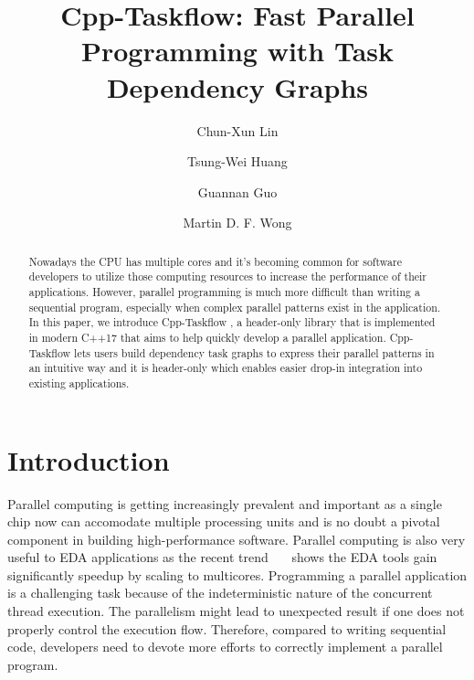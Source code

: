 \documentclass[sigconf]{acmart}
\begin{document}

\fancyhead{}
\title{Cpp-Taskflow: Fast Parallel Programming with Task Dependency Graphs}



\author{Chun-Xun Lin}
%
\author{Tsung-Wei Huang}
%
\author{Guannan Guo}
%
\author{Martin D. F. Wong}





\begin{abstract}
Nowadays the CPU has multiple cores and it's becoming common for software 
developers to utilize those computing resources to increase the performance of their applications.
However, parallel programming is much more difficult than writing a sequential program, 
especially when complex parallel patterns exist in the application. 
In this paper, we introduce Cpp-Taskflow \cite{cpp-taskflow}, a header-only library that is implemented in
modern C++17 that aims to help quickly develop a parallel application. Cpp-Taskflow lets 
users build dependency task graphs to express their parallel patterns in an intuitive way 
and it is header-only which enables easier drop-in integration into existing applications.



\end{abstract}


\maketitle


\section{Introduction}
\label{sec::introduction}
Parallel computing is getting increasingly prevalent and important as a single
chip now can accomodate multiple processing units and is no doubt a pivotal
component in building high-performance software. 
Parallel computing is also very useful to EDA applications as the recent
trend~\cite{routing}~\cite{ot}~\cite{stok}\cite{Lu2018} shows the EDA tools gain significantly speedup
by scaling to multicores.  Programming a parallel application is a challenging
task because of the indeterministic nature of the concurrent thread execution.
The parallelism might lead to unexpected result if one does not properly
control the execution flow.  
Therefore, compared to writing sequential code, developers need to devote 
more efforts to correctly implement a parallel program.
\end{document}
